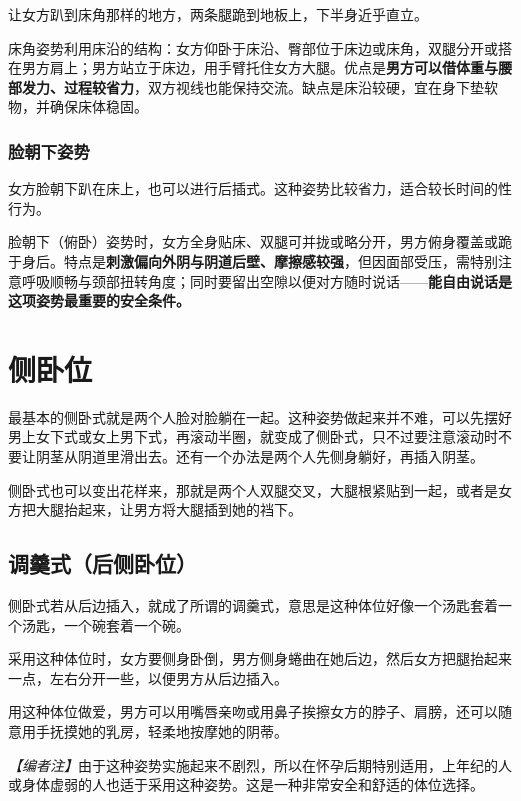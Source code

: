 \documentclass[12pt,UTF8]{ctexbook}
\begin{document}
让女方趴到床角那样的地方，两条腿跪到地板上，下半身近乎直立。

\vspace{0.5em}

床角姿势利用床沿的结构：女方仰卧于床沿、臀部位于床边或床角，双腿分开或搭在男方肩上；男方站立于床边，用手臂托住女方大腿。优点是\textbf{男方可以借体重与腰部发力、过程较省力}，双方视线也能保持交流。缺点是床沿较硬，宜在身下垫软物，并确保床体稳固。

\subsubsection{脸朝下姿势}

女方脸朝下趴在床上，也可以进行后插式。这种姿势比较省力，适合较长时间的性行为。

\vspace{0.5em}

脸朝下（俯卧）姿势时，女方全身贴床、双腿可并拢或略分开，男方俯身覆盖或跪于身后。特点是\textbf{刺激偏向外阴与阴道后壁、摩擦感较强}，但因面部受压，需特别注意呼吸顺畅与颈部扭转角度；同时要留出空隙以便对方随时说话——\textbf{能自由说话是这项姿势最重要的安全条件。}

\section{侧卧位}

最基本的侧卧式就是两个人脸对脸躺在一起。这种姿势做起来并不难，可以先摆好男上女下式或女上男下式，再滚动半圈，就变成了侧卧式，只不过要注意滚动时不要让阴茎从阴道里滑出去。还有一个办法是两个人先侧身躺好，再插入阴茎。

侧卧式也可以变出花样来，那就是两个人双腿交叉，大腿根紧贴到一起，或者是女方把大腿抬起来，让男方将大腿插到她的裆下。

\vspace{0.5em}
\subsection{调羹式（后侧卧位）}

侧卧式若从后边插入，就成了所谓的调羹式，意思是这种体位好像一个汤匙套着一个汤匙，一个碗套着一个碗。

采用这种体位时，女方要侧身卧倒，男方侧身蜷曲在她后边，然后女方把腿抬起来一点，左右分开一些，以便男方从后边插入。

用这种体位做爱，男方可以用嘴唇亲吻或用鼻子挨擦女方的脖子、肩膀，还可以随意用手抚摸她的乳房，轻柔地按摩她的阴蒂。

\vspace{0.5em}
\noindent\textit{【编者注】}由于这种姿势实施起来不剧烈，所以在怀孕后期特别适用，上年纪的人或身体虚弱的人也适于采用这种姿势。这是一种非常安全和舒适的体位选择。
\end{document}
